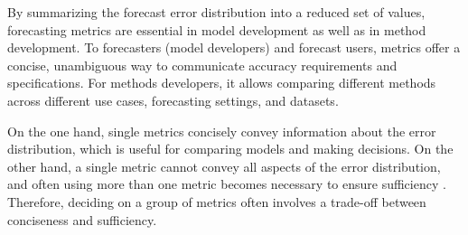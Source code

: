 By summarizing the forecast error distribution into a reduced set of values, forecasting metrics are essential in model development as well as in method development.  To forecasters (model developers) and forecast users, metrics offer  a concise, unambiguous way to communicate accuracy requirements and specifications. For methods developers, it allows comparing different methods across different use cases, forecasting settings, and datasets.

On the one hand, single metrics concisely convey information about the error distribution, which is useful for comparing models and making decisions. On the other hand, a single metric cannot convey all aspects of the error distribution, and often using more than one metric becomes necessary to ensure sufficiency \cite{armstrong2002principles}. Therefore, deciding on a group of metrics often involves a trade-off between conciseness and sufficiency.

